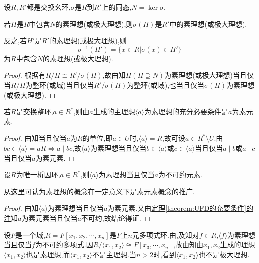 \documentclass[../../main.tex]{subfiles}%
\begin{document}
\begin{theorem}\label{theorem:抽象代数--定理2.8.2}
设$R,R'$都是交换幺环,$\sigma$是$R$到$R'$上的同态,$N = \ker \sigma$.

若$H$是$R$中包含$N$的素理想(或极大理想),则$\sigma(H)$是$R'$中的素理想(或极大理想).

反之,若$H'$是$R'$的素理想(或极大理想),则
$$
\sigma^{-1}(H') = \{x \in R|\sigma(x) \in H'\}
$$
为$R$中包含$N$的素理想(或极大理想).
\end{theorem}
\begin{proof}
根据有$R/H \cong R'/ \sigma(H)$,故由知$H(H \supseteq N)$为素理想(或极大理想)当且仅当$R/H$为整环(或域)当且仅当$R'/ \sigma(H)$为整环(或域),也当且仅当$\sigma(H)$为素理想(或极大理想).
\end{proof}

\begin{theorem}\label{theorem:抽象代数--定理2.8.3}
若$R$是交换整环,$a \in R^*$,则由$a$生成的主理想$\langle a \rangle$为素理想的充分必要条件是$a$为素元素.
\end{theorem}
\begin{proof}
由知当且仅当$a$为$R$的单位,即$a \in U$时,$\langle a \rangle = R$,故可设$a \in R^* \setminus U$.由$bc \in \langle a \rangle = aR \iff a \mid bc$,故$\langle a \rangle$为素理想当且仅当$b\in \langle a \rangle$或$c\in \langle a \rangle$当且仅当$a\mid b$或$a\mid c$当且仅当$a$为素元素.
\end{proof}

\begin{corollary}\label{corollary:抽象代数--推论2.8.2}
设$R$为唯一析因环,$a \in R^*$,则$\langle a \rangle$为素理想当且仅当$a$为不可约元素.
\end{corollary}
\begin{remark}
从这里可认为素理想的概念在一定意义下是素元素概念的推广.
\end{remark}
\begin{proof}
由知$\langle a \rangle$为素理想当且仅当$a$为素元素.又由\hyperref[theorem:UFD的充要条件]{定理\ref{theorem:UFD的充要条件}的注}知$a$为素元素当且仅当$a$不可约,故结论得证.
\end{proof}

\begin{example}
设$F$是一个域,$R = F[x_1,x_2,\cdots,x_n]$是$F$上$n$元多项式环.由,及知对$f \in R$,$\langle f \rangle$为素理想当且仅当$f$为不可约多项式.因$R/\langle x_1,x_2 \rangle \cong F[x_3,\cdots,x_n]$,故由知由$x_1,x_2$生成的理想$\langle x_1,x_2 \rangle$也是素理想,而$\langle x_1,x_2 \rangle$不是主理想.当$n > 2$时,看到$\langle x_1,x_2 \rangle$也不是极大理想.
\end{example}
\end{document}
